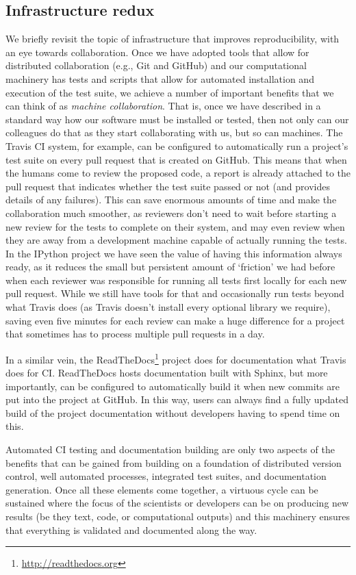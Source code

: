 \documentclass[ChapterTOCs,krantz2]{krantz} %
\begin{document}
\subsection{Infrastructure redux}

We briefly revisit the topic of infrastructure that improves reproducibility,
with an eye towards collaboration.  Once we have adopted tools that allow for
distributed collaboration (e.g., Git and GitHub) and our computational
machinery has tests and scripts that allow for automated installation and
execution of the test suite, we achieve a number of important benefits that we
can think of as \emph{machine collaboration}.  That is, once we have described in
a standard way how our software must be installed or tested, then not only can
our colleagues do that as they start collaborating with us, but so can
machines.  The Travis CI system, for example, can be configured to
automatically run a project's test suite on every pull request that is created
on GitHub.  This means that when the humans come to review the proposed code,
a report is already attached to the pull request that indicates whether the
test suite passed or not (and provides details of any failures).  This can
save enormous amounts of time and make the collaboration much smoother, as
reviewers don't need to wait before starting a new review for the tests to
complete on their system, and may even review when they are away from a
development machine capable of actually running the tests.  In the IPython
project we have seen the value of having this information always ready, as it
reduces the small but persistent amount of `friction' we had before when each
reviewer was responsible for running all tests first locally for each new pull
request.  While we still have tools for that and occasionally run tests beyond
what Travis does (as Travis doesn't install every optional library we
require), saving even five minutes for each review can make a huge
difference for a project that sometimes has to process multiple pull requests
in a day.

In a similar vein, the ReadTheDocs\footnote{\url{http://readthedocs.org}}
project does for documentation what Travis does for CI.  ReadTheDocs hosts
documentation built with Sphinx, but more importantly, can be configured to
automatically build it when new commits are put into the project at GitHub.  In
this way, users can always find a fully updated build of the project
documentation without developers having to spend time on this.

Automated CI testing and documentation building are only two aspects of the
benefits that can be gained from building on a foundation of distributed
version control, well automated processes, integrated test suites, and
documentation generation.  Once all these elements come together, a virtuous
cycle can be sustained where the focus of the scientists or developers can be
on producing new results (be they text, code, or computational outputs) and this
machinery ensures that everything is validated and documented along the way.
\end{document}
